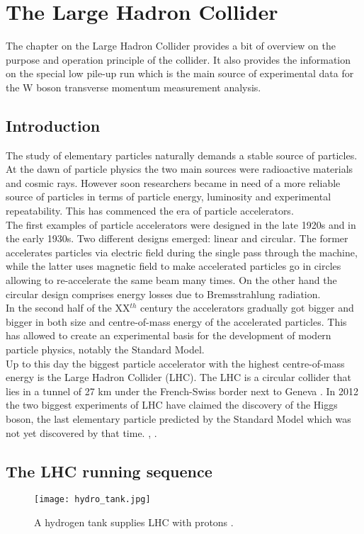 \chapter{The Large Hadron Collider}
   The chapter on the Large Hadron Collider provides a bit of overview on the purpose and operation principle of the collider. It also provides the information on the special low pile-up run which is the main source of experimental data for the W boson transverse momentum measurement analysis.
   
   
    \section{Introduction} 
        The study of elementary particles naturally demands a stable source of particles. At the dawn of particle physics the two main sources were radioactive materials and cosmic rays. However soon researchers became in need of a more reliable source of particles in terms of particle energy, luminosity and experimental repeatability. This has commenced the era of particle accelerators.\\
        The first examples of particle accelerators were designed in the late 1920s and in the early 1930s. Two different designs emerged: linear and circular. The former accelerates particles via electric field during the single pass through the machine, while the latter uses magnetic field to make accelerated particles go in circles allowing to re-accelerate the same beam many times. On the other hand the circular design comprises energy losses due to Bremsstrahlung radiation.\\
        In the second half of the XX$^{th}$ century the accelerators gradually got bigger and bigger in both size and centre-of-mass energy of the accelerated particles. This has allowed to create an experimental basis for the development of modern particle physics, notably the Standard Model.\\
        Up to this day the biggest particle accelerator with the highest centre-of-mass energy is the Large Hadron Collider (LHC). The LHC is a circular collider that lies in a tunnel of 27 km under the French-Swiss border next to Geneva \cite{Bruning:2668521}. In 2012 the two biggest experiments of LHC have claimed the discovery of the Higgs boson, the last elementary particle predicted by the Standard Model which was not yet discovered by that time. \cite{higgs_atlas}, \cite{higgs_cms}.
        
        \section{The LHC running sequence}
                   \begin{figure}[htpb]
        	\texttt{[image: hydro\_tank.jpg]}
        	\caption{A hydrogen tank supplies LHC with protons \cite{hydro}.}
        	\label{fig::hydro}
        \end{figure}
        	

